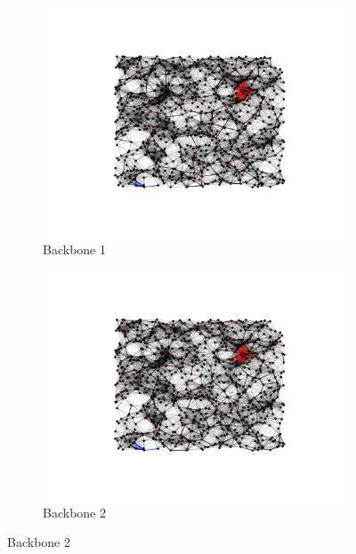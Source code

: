 \documentclass[oneside, titlepage]{scrartcl}
\begin{document}
\begin{figure}[!h]
\begin{subfigure}{0.5\textwidth}
	\centering
	\includegraphics[width=0.9\linewidth]{figures/simplegraph1.pdf}
	\caption{Backbone 1}
\end{subfigure}%
\begin{subfigure}{0.5\textwidth}
	\centering
	\includegraphics[width=0.9\linewidth]{figures/simplegraph11.pdf}
	\caption{Backbone 2}
\end{subfigure}
\end{figure}
\end{document}
